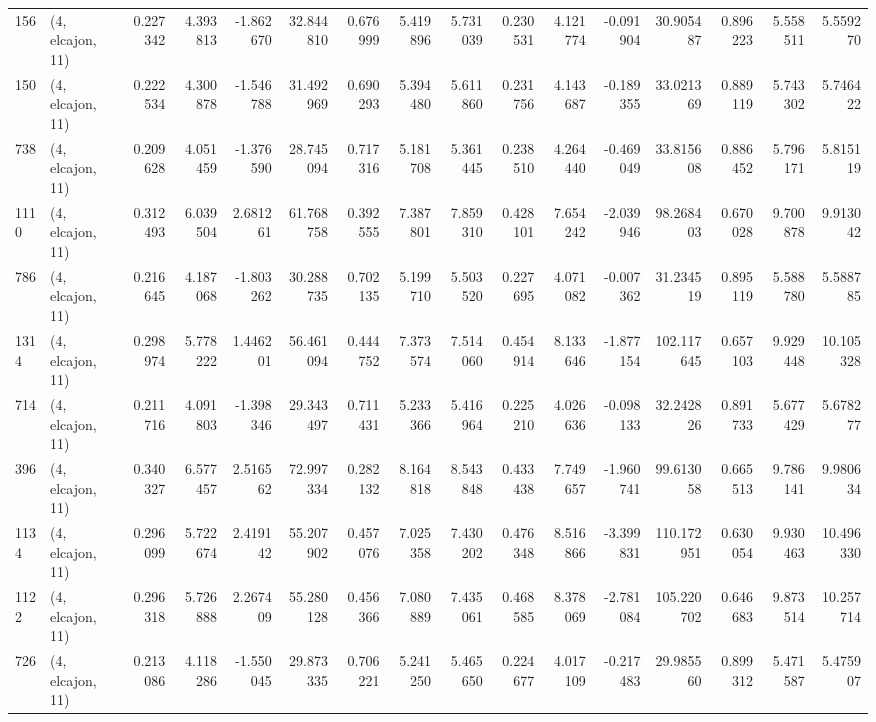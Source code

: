 \begin{tabular}{llrrrrrrrrrrrrrr}
156  &  (4, elcajon, 11) &   0.227342 &   4.393813 &  -1.862670 &     32.844810 &    0.676999 &    5.419896 &    5.731039 &  0.230531 &   4.121774 &  -0.091904 &    30.905487 &   0.896223 &   5.558511 &   5.559270 \\
150  &  (4, elcajon, 11) &   0.222534 &   4.300878 &  -1.546788 &     31.492969 &    0.690293 &    5.394480 &    5.611860 &  0.231756 &   4.143687 &  -0.189355 &    33.021369 &   0.889119 &   5.743302 &   5.746422 \\
738  &  (4, elcajon, 11) &   0.209628 &   4.051459 &  -1.376590 &     28.745094 &    0.717316 &    5.181708 &    5.361445 &  0.238510 &   4.264440 &  -0.469049 &    33.815608 &   0.886452 &   5.796171 &   5.815119 \\
1110 &  (4, elcajon, 11) &   0.312493 &   6.039504 &   2.681261 &     61.768758 &    0.392555 &    7.387801 &    7.859310 &  0.428101 &   7.654242 &  -2.039946 &    98.268403 &   0.670028 &   9.700878 &   9.913042 \\
786  &  (4, elcajon, 11) &   0.216645 &   4.187068 &  -1.803262 &     30.288735 &    0.702135 &    5.199710 &    5.503520 &  0.227695 &   4.071082 &  -0.007362 &    31.234519 &   0.895119 &   5.588780 &   5.588785 \\
1314 &  (4, elcajon, 11) &   0.298974 &   5.778222 &   1.446201 &     56.461094 &    0.444752 &    7.373574 &    7.514060 &  0.454914 &   8.133646 &  -1.877154 &   102.117645 &   0.657103 &   9.929448 &  10.105328 \\
714  &  (4, elcajon, 11) &   0.211716 &   4.091803 &  -1.398346 &     29.343497 &    0.711431 &    5.233366 &    5.416964 &  0.225210 &   4.026636 &  -0.098133 &    32.242826 &   0.891733 &   5.677429 &   5.678277 \\
396  &  (4, elcajon, 11) &   0.340327 &   6.577457 &   2.516562 &     72.997334 &    0.282132 &    8.164818 &    8.543848 &  0.433438 &   7.749657 &  -1.960741 &    99.613058 &   0.665513 &   9.786141 &   9.980634 \\
1134 &  (4, elcajon, 11) &   0.296099 &   5.722674 &   2.419142 &     55.207902 &    0.457076 &    7.025358 &    7.430202 &  0.476348 &   8.516866 &  -3.399831 &   110.172951 &   0.630054 &   9.930463 &  10.496330 \\
1122 &  (4, elcajon, 11) &   0.296318 &   5.726888 &   2.267409 &     55.280128 &    0.456366 &    7.080889 &    7.435061 &  0.468585 &   8.378069 &  -2.781084 &   105.220702 &   0.646683 &   9.873514 &  10.257714 \\
726  &  (4, elcajon, 11) &   0.213086 &   4.118286 &  -1.550045 &     29.873335 &    0.706221 &    5.241250 &    5.465650 &  0.224677 &   4.017109 &  -0.217483 &    29.985560 &   0.899312 &   5.471587 &   5.475907 \\

\end{tabular}
